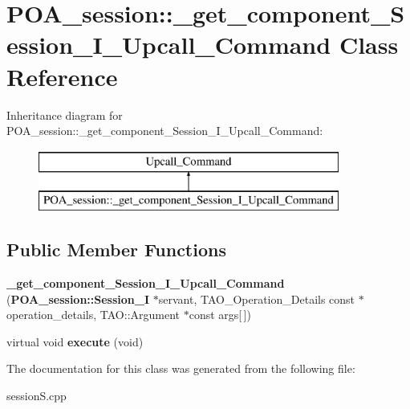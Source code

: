 \section{P\+O\+A\+\_\+session\+:\+:\+\_\+get\+\_\+component\+\_\+\+Session\+\_\+\+I\+\_\+\+Upcall\+\_\+\+Command Class Reference}
\label{classPOA__session_1_1__get__component__Session__I__Upcall__Command}
Inheritance diagram for P\+O\+A\+\_\+session\+:\+:\+\_\+get\+\_\+component\+\_\+\+Session\+\_\+\+I\+\_\+\+Upcall\+\_\+\+Command\+:\begin{figure}[H]
\begin{center}
\leavevmode
\includegraphics[height=2.000000cm]{classPOA__session_1_1__get__component__Session__I__Upcall__Command}
\end{center}
\end{figure}
\subsection*{Public Member Functions}
\begin{DoxyCompactItemize}
\item 
{\bfseries \+\_\+get\+\_\+component\+\_\+\+Session\+\_\+\+I\+\_\+\+Upcall\+\_\+\+Command} ({\bf P\+O\+A\+\_\+session\+::\+Session\+\_\+I} $\ast$servant, T\+A\+O\+\_\+\+Operation\+\_\+\+Details const $\ast$operation\+\_\+details, T\+A\+O\+::\+Argument $\ast$const args[$\,$])\label{classPOA__session_1_1__get__component__Session__I__Upcall__Command_a7241e1465ccf119f8cae00eb82dea724}

\item 
virtual void {\bfseries execute} (void)\label{classPOA__session_1_1__get__component__Session__I__Upcall__Command_a7b5bff9d9936575f2bd59f9c26ed8f83}

\end{DoxyCompactItemize}


The documentation for this class was generated from the following file\+:\begin{DoxyCompactItemize}
\item 
session\+S.\+cpp\end{DoxyCompactItemize}
